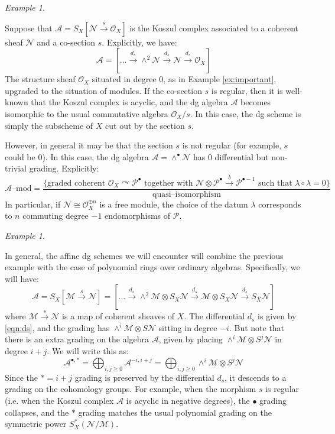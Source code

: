 \documentclass[12pt]{amsart}
\numberwithin{equation}{section}
\theoremstyle{definition}
\theoremstyle{remark}
\newtheorem{example}[theorem]{Example}
\newcommand{\CA}{\mathcal{A}}
\newcommand{\CM}{\mathcal{M}}
\newcommand{\CN}{\mathcal{N}}
\newcommand{\CO}{\mathcal{O}}
\newcommand{\CP}{\mathcal{P}}
\renewcommand{\1}{\mathbf{1}}
\begin{document}
\begin{example}
\label{ex:koszul}

Suppose that $\CA = S_X[\CN \stackrel{s}\rightarrow \CO_X]$ is the Koszul complex associated to a coherent sheaf $\CN$ and a co-section $s$. Explicitly, we have:
$$
\CA = \left[ ... \stackrel{d_s}\longrightarrow \wedge^2 \CN \stackrel{d_s}\longrightarrow \CN \stackrel{d_s}\longrightarrow \CO_X \right]
$$
The structure sheaf $\CO_X$ situated in degree 0, as in Example \ref{ex:important}, upgraded to the situation of modules. If the co-section $s$ is regular, then it is well-known that the Koszul complex is acyclic, and the dg algebra $\CA$ becomes isomorphic to the usual commutative algebra $\CO_X/s$. In this case, the dg scheme is simply the subscheme of $X$ cut out by the section $s$.

However, in general it may be that the section $s$ is not regular (for example, $s$ could be 0). In this case, the dg algebra $\CA = \wedge^\bullet \CN$ has 0 differential but non-trivial grading. Explicitly:
$$
\CA\text{--mod} = \frac {\Big\{\text{graded coherent }\CO_X \curvearrowright \CP^\bullet \text{ together with } \CN \otimes \CP^\bullet \stackrel{\lambda}\rightarrow \CP^{\bullet-1} \text{ such that } \lambda \circ \lambda = 0\Big\}}{\text{quasi--isomorphism}}
$$
In particular, if $\CN \cong \CO_X^{\oplus n}$ is a free module, the choice of the datum $\lambda$ corresponds to $n$ commuting degree $-1$ endomorphisms of $\CP$. 

\end{example}

\begin{example}
\label{ex:affine dg}

In general, the affine dg schemes we will encounter will combine the previous example with the case of polynomial rings over ordinary algebras. Specifically, we will have:
$$
\CA = S_X[\CM \stackrel{s}\longrightarrow \CN] = \left[ ... \stackrel{d_s}\longrightarrow \wedge^2 \CM \otimes S_X\CN \stackrel{d_s}\longrightarrow \CM \otimes S_X\CN \stackrel{d_s}\longrightarrow S_X\CN \right]
$$
where $\CM \stackrel{s}\rightarrow \CN$ is a map of coherent sheaves of $X$. The differential $d_s$ is given by \eqref{eqn:ds}, and the grading has $\wedge^i\CM \otimes S\CN$ sitting in degree $-i$. But note that there is an extra grading on the algebra $\CA$, given by placing $\wedge^i \CM \otimes S^j \CN$ in degree $i+j$. We will write this as:
$$
\CA^{\bullet,*} = \bigoplus_{i,j \geq 0} \CA^{-i,i+j} = \bigoplus_{i,j \geq 0} \wedge^i \CM \otimes S^j \CN
$$
Since the $* = i+j$ grading is preserved by the differential $d_s$, it descends to a grading on the cohomology groups. For example, when the morphism $s$ is regular (i.e. when the Koszul complex $\CA$ is acyclic in negative degrees), the $\bullet$ grading collapses, and the $*$ grading matches the usual polynomial grading on the symmetric power $S^*_X (\CN/\CM)$. 

\end{example}
\end{document}
